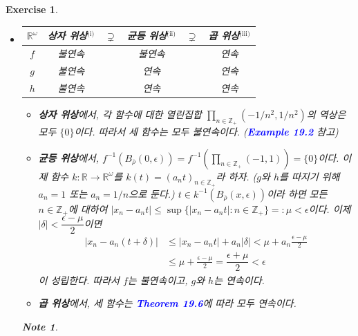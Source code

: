 \documentclass{article}
\newtheorem{exercise}{Exercise}[section]
\newtheorem*{note}{Note}
\newcommand{\R}{\mathbb{R}}
\newcommand{\Z}{\mathbb{Z}}
\begin{document}
\begin{exercise}
	\label{exc:20.4}
    \phantom{}
    \begin{itemize}
        \item[(a)] \phantom{}
            \begin{center}
                \begin{tabular}{|c||ccccc|}
                    \hline
                    $\R^\omega$ & 상자 위상$^{\text{(i)}}$ & $\supsetneq$ & 균등 위상$^{\text{(ii)}}$ & $\supsetneq$ & 곱 위상$^{\text{(iii)}}$ \\ \hline\hline
                   $f$ & 불연속 && 불연속 && 연속 \\ \hline
                   $g$ & 불연속 && 연속 && 연속 \\ \hline
                   $h$ & 불연속 && 연속 && 연속 \\ \hline
                \end{tabular}
            \end{center}
            \begin{itemize}
                \item[(i)] \textbf{상자 위상}에서, 각 함수에 대한 열린집합 $\prod_{n\in\Z_+}(-1/n^2,1/n^2)$의 역상은 모두 $\{0\}$이다. 따라서 세 함수는 모두 불연속이다. (\textcolor{blue}{\textbf{Example 19.2}} 참고)
                \item[(ii)] \textbf{균등 위상}에서, $f^{-1}(B_{\overline{\rho}}(0,\epsilon))=f^{-1}(\prod_{n\in\Z_+}(-1,1))=\{0\}$이다. 이제 함수 $k:\R\to\R^\omega$를 $k(t)=(a_nt)_{n\in\Z_+}$라 하자. ($g$와 $h$를 따지기 위해 $a_n=1$ 또는 $a_n=1/n$으로 둔다.) $t\in k^{-1}(B_{\overline{\rho}}(x,\epsilon))$이라 하면 모든 $n\in\Z_+$에 대하여 $\vert x_n-a_nt\vert\leq\sup\{\vert x_n-a_nt\vert:n\in\Z_+\}=:\mu<\epsilon$이다. 이제 $\vert\delta\vert <\dfrac{\epsilon-\mu}{2}$이면
                \begin{align*}
                    \vert x_n-a_n(t+\delta)\vert&\leq\vert x_n-a_nt\vert+a_n\vert \delta\vert<\mu+a_n\frac{\epsilon-\mu}{2}\\
                    &\leq\mu+\frac{\epsilon-\mu}{2}=\dfrac{\epsilon+\mu}{2}<\epsilon
                \end{align*}
                이 성립한다. 따라서 $f$는 불연속이고, $g$와 $h$는 연속이다.
                \item[(iii)] \textbf{곱 위상}에서, 세 함수는 \textcolor{blue}{\textbf{Theorem 19.6}}에 따라 모두 연속이다.
            \end{itemize}
            \begin{note}

\end{note}
\end{itemize}
\end{exercise}
\end{document}
